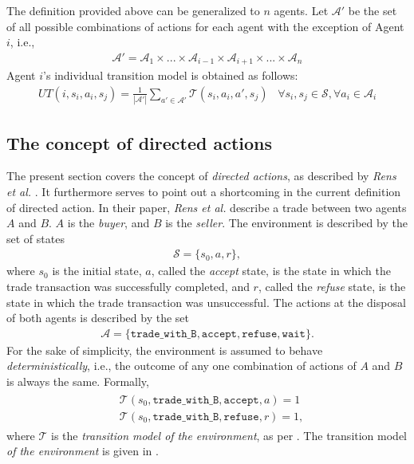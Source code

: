The definition provided above can be generalized to $n$ agents.
Let $\mathcal{A}'$ be the set of all possible combinations of actions for each agent with the exception of Agent $i$, i.e.,
\begin{align}
    \mathcal{A}' = \mathcal{A}_{1} \times ... \times \mathcal{A}_{i-1} \times \mathcal{A}_{i+1} \times ... \times \mathcal{A}_{n}
\end{align}
Agent $i$'s individual transition model is obtained as follows:
\begin{align}
    UT(i, s_i, a_i, s_j) = \frac{1}{|\mathcal{A}'|} \sum_{a' \in \mathcal{A}'} \mathcal{T}(s_i, a_i, a', s_j)  \,\,\,\,\, \forall s_i, s_j \in \mathcal{S}, \forall a_i \in \mathcal{A}_i
\end{align}












\subsection{The concept of directed actions}
\label{sec:dirr}


The present section covers the concept of \textit{directed actions}, as described by \textit{Rens et al.} \cite{rensetal}. It furthermore serves to point out a shortcoming in the current definition of directed action.
In their paper, \textit{Rens et al.} describe a trade between two agents $A$ and $B$. $A$ is the \textit{buyer}, and $B$ is the \textit{seller}. The environment is described by the set of states 
\begin{align}
    \mathcal{S} = \{s_0, a, r\},
\end{align}
where $s_0$ is the initial state, $a$, called the \textit{accept} state, is the state in which the trade transaction was successfully completed, and $r$, called the \textit{refuse} state, is the state in which the trade transaction was unsuccessful. The actions at the disposal of both agents is described by the set 
\begin{align}
    \mathcal{A} = \{\texttt{trade\_with\_B}, \texttt{accept}, \texttt{refuse}, \texttt{wait}\}.
\end{align}
For the sake of simplicity, the environment is assumed to behave \textit{deterministically}, i.e., the outcome of any one combination of actions of $A$ and $B$ is always the same. Formally,
\begin{align}
\begin{split}
    &\mathcal{T}(s_0, \texttt{trade\_with\_B}, \texttt{accept}, a) = 1 \\
    &\mathcal{T}(s_0, \texttt{trade\_with\_B}, \texttt{refuse}, r) = 1,
\end{split}
\end{align}
where $\mathcal{T}$ is the \textit{transition model of the environment}, as per .
The transition model \textit{of the environment} is given in .
    
